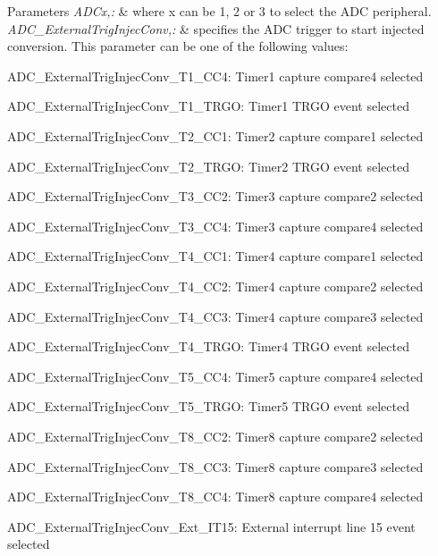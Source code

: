 \begin{DoxyParams}{Parameters}
{\em A\-D\-Cx,\-:} & where x can be 1, 2 or 3 to select the A\-D\-C peripheral. \\
\hline
{\em A\-D\-C\-\_\-\-External\-Trig\-Injec\-Conv,\-:} & specifies the A\-D\-C trigger to start injected conversion. This parameter can be one of the following values\-: \begin{DoxyItemize}
\item A\-D\-C\-\_\-\-External\-Trig\-Injec\-Conv\-\_\-\-T1\-\_\-\-C\-C4\-: Timer1 capture compare4 selected \item A\-D\-C\-\_\-\-External\-Trig\-Injec\-Conv\-\_\-\-T1\-\_\-\-T\-R\-G\-O\-: Timer1 T\-R\-G\-O event selected \item A\-D\-C\-\_\-\-External\-Trig\-Injec\-Conv\-\_\-\-T2\-\_\-\-C\-C1\-: Timer2 capture compare1 selected \item A\-D\-C\-\_\-\-External\-Trig\-Injec\-Conv\-\_\-\-T2\-\_\-\-T\-R\-G\-O\-: Timer2 T\-R\-G\-O event selected \item A\-D\-C\-\_\-\-External\-Trig\-Injec\-Conv\-\_\-\-T3\-\_\-\-C\-C2\-: Timer3 capture compare2 selected \item A\-D\-C\-\_\-\-External\-Trig\-Injec\-Conv\-\_\-\-T3\-\_\-\-C\-C4\-: Timer3 capture compare4 selected \item A\-D\-C\-\_\-\-External\-Trig\-Injec\-Conv\-\_\-\-T4\-\_\-\-C\-C1\-: Timer4 capture compare1 selected \item A\-D\-C\-\_\-\-External\-Trig\-Injec\-Conv\-\_\-\-T4\-\_\-\-C\-C2\-: Timer4 capture compare2 selected \item A\-D\-C\-\_\-\-External\-Trig\-Injec\-Conv\-\_\-\-T4\-\_\-\-C\-C3\-: Timer4 capture compare3 selected \item A\-D\-C\-\_\-\-External\-Trig\-Injec\-Conv\-\_\-\-T4\-\_\-\-T\-R\-G\-O\-: Timer4 T\-R\-G\-O event selected \item A\-D\-C\-\_\-\-External\-Trig\-Injec\-Conv\-\_\-\-T5\-\_\-\-C\-C4\-: Timer5 capture compare4 selected \item A\-D\-C\-\_\-\-External\-Trig\-Injec\-Conv\-\_\-\-T5\-\_\-\-T\-R\-G\-O\-: Timer5 T\-R\-G\-O event selected \item A\-D\-C\-\_\-\-External\-Trig\-Injec\-Conv\-\_\-\-T8\-\_\-\-C\-C2\-: Timer8 capture compare2 selected \item A\-D\-C\-\_\-\-External\-Trig\-Injec\-Conv\-\_\-\-T8\-\_\-\-C\-C3\-: Timer8 capture compare3 selected \item A\-D\-C\-\_\-\-External\-Trig\-Injec\-Conv\-\_\-\-T8\-\_\-\-C\-C4\-: Timer8 capture compare4 selected \item A\-D\-C\-\_\-\-External\-Trig\-Injec\-Conv\-\_\-\-Ext\-\_\-\-I\-T15\-: External interrupt line 15 event selected \end{DoxyItemize}
\\
\hline
\end{DoxyParams}


